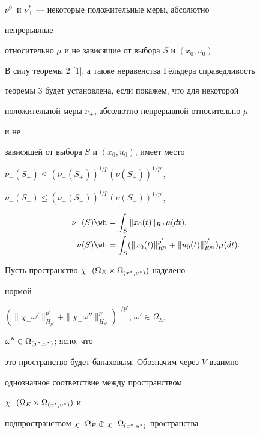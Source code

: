 $\nu^0_+$ и $\nu^*_+$ --- некоторые положительные меры, абсолютно 


непрерывные 


относительно $\mu$ и не зависящие от выбора $S$ и $(x_0,u_0)$. 


 


В силу теоремы 2 [1], а также неравенства Г\"ельдера справедливость 


теоремы 3 будет установлена, если покажем, что для некоторой 


положительной меры $\nu_+$, абсолютно непрерывной относительно $\mu$ 


и не 


зависящей от выбора $S$ и $(x_0,u_0)$, имеет место 


$\nu_-(S_+)\le(\nu_+(S_+))^{1/p}(\nu(S_+))^{1/p'}$, 


$\nu_-(S_-)\le(\nu_+(S_-))^{1/p}(\nu(S_-))^{1/p'}$, 


\begin{equation} 


\begin{split} 


\nu_-(S)&\wh =\int_S\|\Dot x_0(t)\|_{R^n}\mu(dt),\\ 


\nu(S)&\wh =\int_S(\|x_0(t)\|^{p'}_{R^n}+ 


\|u_0(t)\|^{p'}_{R^m})\mu(dt). 


\end{split} 


\end{equation} 


 


Пусть пространство $\chi_-(\Omega_E\times\Omega_{{(x^*_{},u^*_{})}})$ наделено 


нормой 


$(\|\chi_-\omega'\|^{p'}_{H_{p'}}+ 


\|\chi_-\omega''\|^{p'}_{H_{p'}})^{1/p'}$, $\omega'\in\Omega_E$, 


$\omega''\in\Omega_{{(x^*_{},u^*_{})}}$; ясно, что 


это пространство будет банаховым. Обозначим через $V$ взаимно 


однозначное соответствие между пространством 


$\chi_-(\Omega_E\times\Omega_{{(x^*_{},u^*_{})}})$ и 


подпространством $\chi_-\Omega_E\oplus\chi_-\Omega_{{(x^*_{},u^*_{})}}$ пространства 


